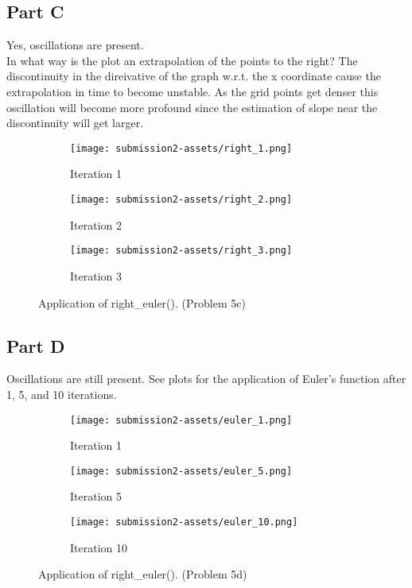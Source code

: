 \documentclass{article}
\begin{document}
\subsection*{Part C}
Yes, oscillations are present. \\
In what way is the plot an extrapolation of the points to the right? The discontinuity in the direivative of the graph w.r.t. the x coordinate cause the extrapolation in time to become unstable. As the grid points get denser this oscillation will become more profound since the estimation of slope near the discontinuity will get larger.
\begin{figure}[h!]
    \centering
    \begin{subfigure}[b]{0.3\linewidth}
        \texttt{[image: submission2-assets/right\_1.png]}
        \caption{Iteration 1}
    \end{subfigure}
    \begin{subfigure}[b]{0.3\linewidth}
        \texttt{[image: submission2-assets/right\_2.png]}
        \caption{Iteration 2}
    \end{subfigure}
    \begin{subfigure}[b]{0.3\linewidth}
        \texttt{[image: submission2-assets/right\_3.png]}
        \caption{Iteration 3}
    \end{subfigure}
    \caption{Application of right\_euler(). (Problem 5c)}
\end{figure}


\subsection*{Part D}
Oscillations are still present. See plots for the application of Euler's function after 1, 5, and 10 iterations.
\begin{figure}[h!]
    \centering
    \begin{subfigure}[b]{0.3\linewidth}
        \texttt{[image: submission2-assets/euler\_1.png]}
        \caption{Iteration 1}
    \end{subfigure}
    \begin{subfigure}[b]{0.3\linewidth}
        \texttt{[image: submission2-assets/euler\_5.png]}
        \caption{Iteration 5}
    \end{subfigure}
    \begin{subfigure}[b]{0.3\linewidth}
        \texttt{[image: submission2-assets/euler\_10.png]}
        \caption{Iteration 10}
    \end{subfigure}
    \caption{Application of right\_euler(). (Problem 5d)}
\end{figure}
\end{document}
